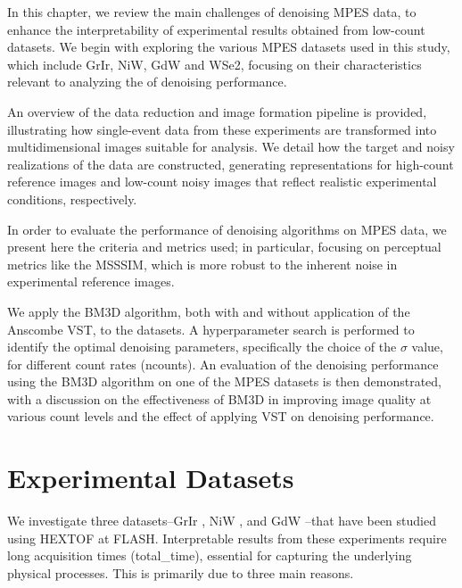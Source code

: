 In this chapter, we review the main challenges of denoising \gls{MPES} data, to enhance the interpretability of experimental results obtained from low-count datasets. We begin with exploring the various \gls{MPES} datasets used in this study, which include \gls{GrIr}, \gls{NiW}, \gls{GdW} and \gls{WSe2}, focusing on their characteristics relevant to analyzing the of denoising performance.

An overview of the data reduction and image formation pipeline is provided, illustrating how single-event data from these experiments are transformed into multidimensional images suitable for analysis. We detail how the target and noisy realizations of the data are constructed, generating representations for high-count reference images and low-count noisy images that reflect realistic experimental conditions, respectively.

In order to evaluate the performance of denoising algorithms on \gls{MPES} data, we present here the criteria and metrics used; in particular, focusing on perceptual metrics like the \gls{MSSSIM}, which is more robust to the inherent noise in experimental reference images.

We apply the \gls{BM3D} algorithm, both with and without application of the Anscombe \gls{VST}, to the datasets. A hyperparameter search is performed to identify the optimal denoising parameters, specifically the choice of the $\sigma$ value, for different count rates (\gls{ncounts}). An evaluation of the denoising performance using the \gls{BM3D} algorithm on one  of the \gls{MPES} datasets is then demonstrated, with a discussion on the effectiveness of \gls{BM3D} in improving image quality at various count levels and the effect of applying \gls{VST} on denoising performance.

\section{Experimental Datasets}\label{section:datasets}
We investigate three datasets--\gls{GrIr} \cite{heberMultispectralTimeresolvedEnergy2022}, \gls{NiW} \cite{shokeenRealtimeObservationNonequilibrium2024}, and \gls{GdW} \cite{kutnyakhovMultidimensionalPhotoemissionSpectra2024}--that have been studied using \gls{HEXTOF} at \gls{FLASH}. Interpretable results from these experiments require long acquisition times (\gls{total_time}), essential for capturing the underlying physical processes. This is primarily due to three main reasons.


